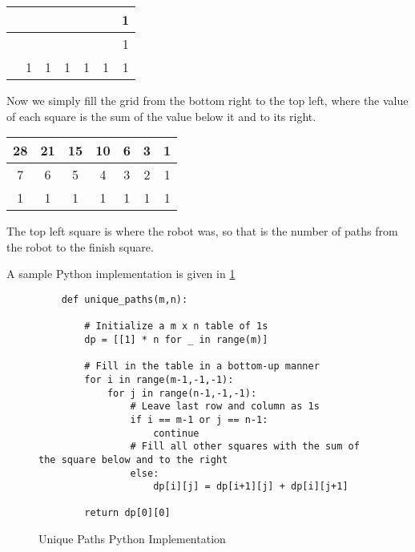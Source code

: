 \begin{table}[H]
    \centering
    \begin{tabular}{|c|c|c|c|c|c|c|}
        \hline
         &  &  &  &  &  & 1 \\
        \hline
         &  &  &  &  &  & 1 \\
        \hline
         & 1 & 1 & 1 & 1 & 1 & 1 \\
        \hline
    \end{tabular}
\end{table}

Now we simply fill the grid from the bottom right to the top left,
where the value of each square is the sum of the value below it and to its right.

\begin{table}[H]
    \centering
    \begin{tabular}{|c|c|c|c|c|c|c|}
        \hline
        28 & 21 & 15 & 10 & 6 & 3 & 1 \\
        \hline
        7 & 6 & 5 & 4 & 3 & 2 & 1 \\
        \hline
        1 & 1 & 1 & 1 & 1 & 1 & 1 \\
        \hline
    \end{tabular}
\end{table}

The top left square is where the robot was, so that is the number of paths from the robot to the finish square.

A sample Python implementation is given in \ref{fig:unique-paths}
\begin{figure}[H]
    \centering
    \begin{lstlisting}
    def unique_paths(m,n):
    
        # Initialize a m x n table of 1s
        dp = [[1] * n for _ in range(m)]
    
        # Fill in the table in a bottom-up manner
        for i in range(m-1,-1,-1):
            for j in range(n-1,-1,-1):
                # Leave last row and column as 1s
                if i == m-1 or j == n-1:
                    continue
                # Fill all other squares with the sum of the square below and to the right
                else:
                    dp[i][j] = dp[i+1][j] + dp[i][j+1]

        return dp[0][0]
    \end{lstlisting}
    \caption{Unique Paths Python Implementation}
    \label{fig:unique-paths}
\end{figure}

